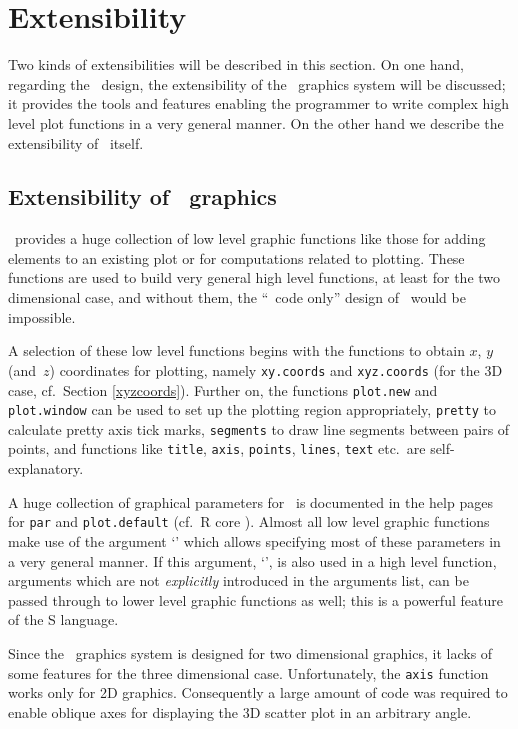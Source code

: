 \section{Extensibility\label{extend}}
Two kinds of extensibilities will be described in this section.
On one hand, regarding the \sdd\ design, the extensibility of the \RR\ graphics system will be discussed;
it provides the tools and features enabling the programmer to write complex
high level plot functions in a very general manner.
On the other hand we describe the extensibility of \sdd\ itself.


\subsection{Extensibility of \RR\ graphics\label{exR}}
\RR\ provides a huge collection of low level graphic functions like those
for adding elements to an existing plot or for computations related to
plotting.
%
These functions are used to build very general high level functions, at
least for the two dimensional case, and without them, the ``\RR\ code
only'' design of \sdd\ would be impossible.

A selection of these low level functions begins with the functions to obtain $x$, $y$ (and~$z$) coordinates for plotting,
namely {\tt xy.coords} and {\tt xyz.coords} (for the 3D case, cf.\ Section \ref{xyzcoords}).
Further on, the functions {\tt plot.new} and {\tt plot.window} can be used to set up the plotting region appropriately,
{\tt pretty} to calculate pretty axis tick marks,
{\tt segments} to draw line segments between pairs of points,
and functions like {\tt title}, {\tt axis}, {\tt points}, {\tt lines}, {\tt text} etc.~are self-explanatory.

A huge collection of graphical parameters for \RR\ is documented in the
help pages for {\tt par} and {\tt plot.default} (cf.\ R core \citeyear{r-ref}).
Almost all low level graphic functions make use of the argument `'
which allows specifying most of these parameters in a very general manner.
If this argument, `', is also used in a high level function,
arguments which are not \textsl{explicitly} introduced in the arguments list,
can be passed through to lower level graphic functions as well;  this
is a powerful feature of the \textsf{S} language.

\enlargethispage{5mm}
Since the \RR\ graphics system is designed for two dimensional graphics,
it lacks of some features for the three dimensional case.
Unfortunately, the {\tt axis} function works only for 2D graphics.
Consequently a large amount of code was required to
enable oblique axes for displaying the 3D scatter plot in an arbitrary
angle.

